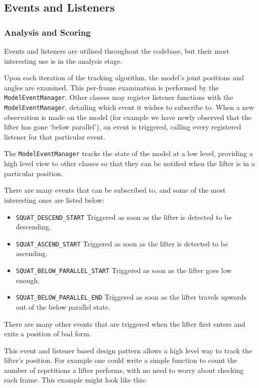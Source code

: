 \subsection{Events and Listeners}
\label{sec:listeners}

\subsubsection{Analysis and Scoring}

Events and listeners are utilised throughout the codebase, but their most interesting use is in the analysis stage.

Upon each iteration of the tracking algorithm, the model's joint positions and angles are examined. This per-frame examination is performed by the \verb!ModelEventManager!. Other classes may register listener functions with the \verb!ModelEventManager!, detailing which event it wishes to subscribe to. When a new observation is made on the model (for example we have newly observed that the lifter has gone `below parallel'), an event is triggered, calling every registered listener for that particular event.

The \verb!ModelEventManager! tracks the state of the model at a low level, providing a high level view to other classes so that they can be notified when the lifter is in a particular position.

There are many events that can be subscribed to, and some of the most interesting ones are listed below:

\begin{itemize}
	\item \verb!SQUAT_DESCEND_START! Triggered as soon as the lifter is detected to be descending.
	\item \verb!SQUAT_ASCEND_START! Triggered as soon as the lifter is detected to be ascending.
	\item \verb!SQUAT_BELOW_PARALLEL_START! Triggered as soon as the lifter goes low enough.
	\item \verb!SQUAT_BELOW_PARALLEL_END! Triggered as soon as the lifter travels upwards out of the below parallel state.
\end{itemize}

There are many other events that are triggered when the lifter first enters and exits a position of bad form.

This event and listener based design pattern allows a high level way to track the lifter's position. For example one could write a simple function to count the number of repetitions a lifter performs, with no need to worry about checking each frame. This example might look like this:


